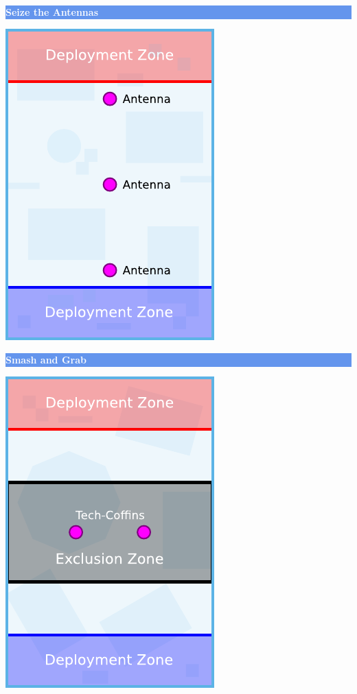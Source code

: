 \documentclass[14pt,dvipsnames]{extarticle}
\begin{document}
\vspace{-0.5em}
\noindent\hfill
\begin{minipage}{2in}\centering
\colorbox{CornflowerBlue}{\parbox[t][12pt]{\linewidth}{\centering\textcolor{White}{\textbf{Seize the Antennas}}}}

\smallskip
\includegraphics[scale=0.9]{maps/map-seizetheantennas}
\end{minipage}
\hfill
\begin{minipage}{2in}\centering
\colorbox{CornflowerBlue}{\parbox[t][12pt]{\linewidth-2\fboxsep}{\centering\textcolor{White}{\textbf{Smash and Grab}}}}

\smallskip
\includegraphics[scale=0.9]{maps/map-smashandgrab}
\end{minipage}
\end{document}
